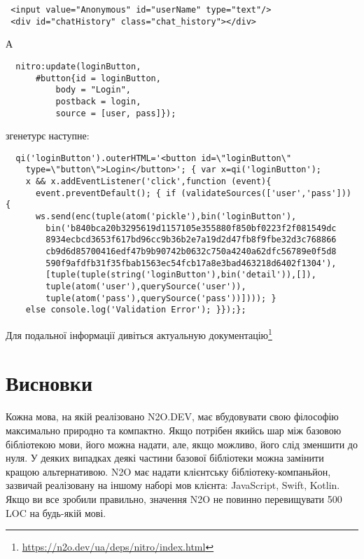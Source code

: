 \begin{lstlisting}
 <input value="Anonymous" id="userName" type="text"/>
 <div id="chatHistory" class="chat_history"></div>
\end{lstlisting}

А

\begin{lstlisting}
  nitro:update(loginButton,
      #button{id = loginButton,
          body = "Login",
          postback = login,
          source = [user, pass]});
\end{lstlisting}

згенетурє наступне:

\begin{lstlisting}
  qi('loginButton').outerHTML='<button id=\"loginButton\"
    type=\"button\">Login</button>'; { var x=qi('loginButton');
    x && x.addEventListener('click',function (event){
      event.preventDefault(); { if (validateSources(['user','pass'])) {
      ws.send(enc(tuple(atom('pickle'),bin('loginButton'),
        bin('b840bca20b3295619d1157105e355880f850bf0223f2f081549dc
        8934ecbcd3653f617bd96cc9b36b2e7a19d2d47fb8f9fbe32d3c768866
        cb9d6d85700416edf47b9b90742b0632c750a4240a62dfc56789e0f5d8
        590f9afdfb31f35fbab1563ec54fcb17a8e3bad463218d6402f1304'),
        [tuple(tuple(string('loginButton'),bin('detail')),[]),
        tuple(atom('user'),querySource('user')),
        tuple(atom('pass'),querySource('pass'))]))); }
    else console.log('Validation Error'); }});};
\end{lstlisting}

Для подальної інформації дивіться актуальную
документацію\footnote{\url{https://n2o.dev/ua/deps/nitro/index.html}}

\section{Висновки}

Кожна мова, на якій реалізовано N2O.DEV, має вбудовувати
свою філософію максимально природно та компактно. Якщо
потрібен якийсь шар між базовою бібліотекою мови,
його можна надати, але, якщо можливо, його слід
зменшити до нуля. У деяких випадках деякі частини
базової бібліотеки можна замінити кращою альтернативою.
N2O має надати клієнтську бібліотеку-компаньйон,
зазвичай реалізовану на іншому наборі мов клієнта:
JavaScript, Swift, Kotlin. Якщо ви все зробили
правильно, значення N2O не повинно перевищувати
500 LOC на будь-якій мові.
